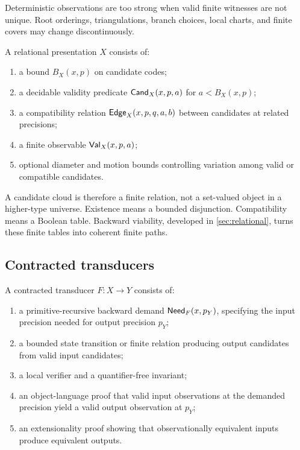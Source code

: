 Deterministic observations are too strong when valid finite witnesses are not
unique.  Root orderings, triangulations, branch choices, local charts, and
finite covers may change discontinuously.

\begin{definition}
A relational presentation \(X\) consists of:
\begin{enumerate}
\item a bound \(B_X(x,p)\) on candidate codes;
\item a decidable validity predicate \(\mathsf{Cand}_X(x,p,a)\) for
\(a<B_X(x,p)\);
\item a compatibility relation
\(\mathsf{Edge}_X(x,p,q,a,b)\) between candidates at related precisions;
\item a finite observable \(\mathsf{Val}_X(x,p,a)\);
\item optional diameter and motion bounds controlling variation among valid
or compatible candidates.
\end{enumerate}
\end{definition}

A candidate cloud is therefore a finite relation, not a set-valued object in a
higher-type universe.  Existence means a bounded disjunction.  Compatibility
means a Boolean table.  Backward viability, developed in \cref{sec:relational},
turns these finite tables into coherent finite paths.

\subsection{Contracted transducers}

\begin{definition}
A contracted transducer \(F:X\to Y\) consists of:
\begin{enumerate}
\item a primitive-recursive backward demand
\(\mathsf{Need}_F(x,p_Y)\), specifying the input precision needed for output precision
\(p_Y\);
\item a bounded state transition or finite relation producing output
candidates from valid input candidates;
\item a local verifier and a quantifier-free invariant;
\item an object-language proof that valid input observations at the demanded
precision yield a valid output observation at \(p_Y\);
\item an extensionality proof showing that observationally equivalent inputs
produce equivalent outputs.
\end{enumerate}
\end{definition}

